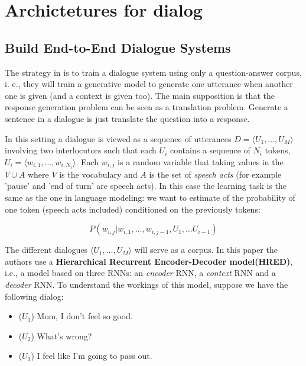 \chapter{Archictetures for dialog}\label{architectures}

\section{Build End-to-End Dialogue Systems} 

The strategy in \cite{Serban:2016a} is to train a dialogue system using only a question-answer corpus, i. e., they will train a generative model to generate one utterance when another one is given (and a context is given too). The main supposition is that the response generation problem can be seen as a translation problem. Generate a sentence in a dialogue is just translate the question into a response.

\par In this setting a dialogue is viewed as a sequence of utterances $D=\langle U_1 , \dots, U_M \rangle$ involving two interlocutors such that each $U_i$ contains a sequence of $N_i$ tokens, $U_i = \langle w_{i,1} , \dots, w_{i,N_{i}} \rangle$. Each $w_{i,j}$ is a random variable that taking values in the $V\cup A$ where $V$ is the vocabulary and $A$ is the set of \textit{speech acts} (for example 'pause' and 'end of turn' are  speech acts). In this case the learning task is the same as the one in language modeling: we want to estimate of the probability of one token (speech acts included) conditioned on the previously tokens:

\begin{equation}
P(w_{i,j} | w_{i,1}, \dots , w_{i,j-1}, U_{1}, \dots U_{i-1})
\end{equation}

The different dialogues $\langle U_1 , \dots, U_M \rangle$ will serve as a corpus.
In this paper the authors use a \textbf{Hierarchical Recurrent Encoder-Decoder model(HRED)}, i.e., a model based on three RNNs: an \textit{encoder} RNN, a \textit{context} RNN and a \textit{decoder} RNN.  To understand the workings of this model, suppose we have the following dialog:
\begin{itemize}
\item ($U_1$) Mom, I don't feel so good.\\
\item ($U_2$) What's wrong?\\
\item ($U_3$) I feel like I'm going to pass out.
\end{itemize}

